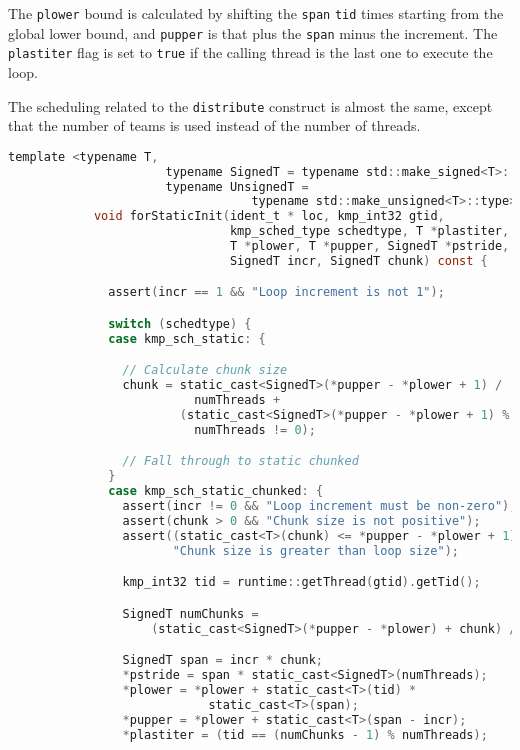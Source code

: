 \begin{itemize}
	      The \texttt{plower} bound is calculated by shifting the \texttt{span} \texttt{tid} times
	      starting from the global lower bound, and \texttt{pupper} is that plus the \texttt{span}
	      minus the increment. The \texttt{plastiter} flag is set to \texttt{true} if the calling
	      thread is the last one to execute the loop.

	      The scheduling related to the \texttt{distribute} construct is almost the same, except
	      that the number of teams is used instead of the number of threads.

	      \begin{lstlisting}[language=C, caption={void Team::forStaticInit},
          label={lst:team-forstaticinit}, escapechar=@]
            template <typename T,
                      typename SignedT = typename std::make_signed<T>::type,
                      typename UnsignedT =
                                  typename std::make_unsigned<T>::type>
            void forStaticInit(ident_t * loc, kmp_int32 gtid,
                               kmp_sched_type schedtype, T *plastiter,
                               T *plower, T *pupper, SignedT *pstride,
                               SignedT incr, SignedT chunk) const {

              assert(incr == 1 && "Loop increment is not 1");

              switch (schedtype) {
              case kmp_sch_static: {

                // Calculate chunk size
                chunk = static_cast<SignedT>(*pupper - *plower + 1) /
                          numThreads +
                        (static_cast<SignedT>(*pupper - *plower + 1) %
                          numThreads != 0);

                // Fall through to static chunked
              }
              case kmp_sch_static_chunked: {
                assert(incr != 0 && "Loop increment must be non-zero");
                assert(chunk > 0 && "Chunk size is not positive");
                assert((static_cast<T>(chunk) <= *pupper - *plower + 1) &&
                       "Chunk size is greater than loop size");

                kmp_int32 tid = runtime::getThread(gtid).getTid();

                SignedT numChunks =
                    (static_cast<SignedT>(*pupper - *plower) + chunk) / chunk;

                SignedT span = incr * chunk;
                *pstride = span * static_cast<SignedT>(numThreads);
                *plower = *plower + static_cast<T>(tid) *
                            static_cast<T>(span);
                *pupper = *plower + static_cast<T>(span - incr);
                *plastiter = (tid == (numChunks - 1) % numThreads);


\end{lstlisting}
\end{itemize}
